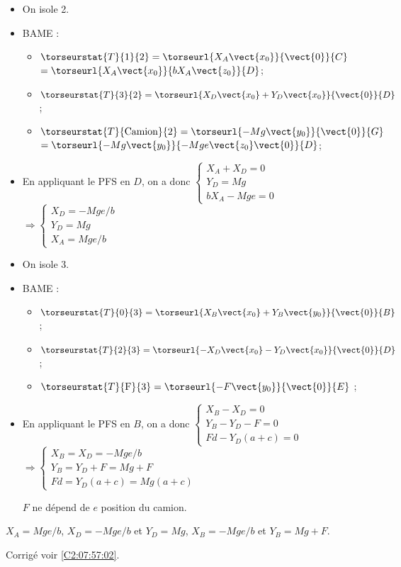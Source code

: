 \ifprof
\begin{itemize}
\item On isole 2.
\item BAME :
\begin{itemize}
\item $\torseurstat{T}{1}{2} = \torseurl{X_A\vect{x_0}}{\vect{0}}{C}$ $= \torseurl{X_A\vect{x_0}}{bX_A\vect{z_0}}{D}$;
\item $\torseurstat{T}{3}{2} = \torseurl{X_D\vect{x_0}+Y_D\vect{x_0}}{\vect{0}}{D}$;
\item $\torseurstat{T}{\text{Camion}}{2} = \torseurl{-Mg\vect{y_0}}{\vect{0}}{G}$ $ = \torseurl{-Mg\vect{y_0}}{-Mge\vect{z_0}\vect{0}}{D}$;
\end{itemize}
\item En appliquant le PFS en $D$, on a donc 
$
\left\{
\begin{array}{l}
X_A + X_D = 0 \\
Y_D = Mg \\
bX_A -Mge = 0
\end{array}
\right.$
$
\Rightarrow \left\{
\begin{array}{l}
X_D = - Mge/b \\
Y_D =  Mg \\
X_A  = Mge/b
\end{array}
\right.$
\end{itemize}
\else
\fi


\ifprof
\begin{itemize}
\item On isole 3.
\item BAME :
\begin{itemize}
\item $\torseurstat{T}{0}{3} = \torseurl{X_B\vect{x_0}+Y_B\vect{y_0}}{\vect{0}}{B}$;
\item $\torseurstat{T}{2}{3} = \torseurl{-X_D\vect{x_0}-Y_D\vect{x_0}}{\vect{0}}{D}$;
\item $\torseurstat{T}{\text{F}}{3} = \torseurl{-F\vect{y_0}}{\vect{0}}{E}$ ;
\end{itemize}
\item En appliquant le PFS en $B$, on a donc 
$
\left\{
\begin{array}{l}
X_B  - X_D = 0\\
Y_B -  Y_D -F =0 \\
Fd  - Y_D(a+c) = 0
\end{array}
\right.$
$
\Rightarrow \left\{
\begin{array}{l}
X_B  = X_D = - Mge/b  \\
Y_B = Y_D + F = Mg +F \\
Fd = Y_D(a+c) =Mg(a+c) 
\end{array}
\right.$


$F$ ne dépend de $e$ position du camion. 
\end{itemize}
\else
\fi


\ifprof
$X_A =Mge/b$,  $X_D = - Mge/b$ et $Y_D =  Mg$, $X_B  = - Mge/b$ et $Y_B = Mg +F$. 
\else
\fi

\ifprof
\else
\begin{flushright}
\footnotesize{Corrigé voir \ref{C2:07:57:02}.}
\end{flushright}%
\fi